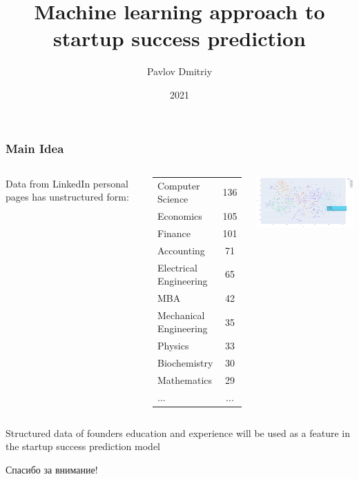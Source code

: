 \documentclass[8pt]{beamer}
\title{\huge{Machine learning approach to startup success prediction}}
\author{Pavlov Dmitriy}
\institute{Moscow Institute of Physics and Technology}
\date{2021}
\begin{document}
\frame{\titlepage}


\begin{frame}
    \frametitle{Main Idea}
    
    
    
    \begin{columns}
        
        Data from LinkedIn personal pages has unstructured form:
        
        \begin{center}
            \begin{tabular}{ l c }
            Computer Science                                  & 136 \\
            Economics                                         & 105 \\ 
            Finance                                           & 101 \\
            Accounting                                        &  71 \\ 
            Electrical Engineering                            &  65 \\ 
            MBA   &  42 \\ 
            Mechanical Engineering                            &  35 \\ 
            Physics                                           &  33 \\ 
            Biochemistry                                      &  30 \\ 
            Mathematics                                       &  29 \\
            ...                                               & ... \\
            \end{tabular}
        \end{center}
    
    
       \includegraphics[width=7cm]{figures/paper/kMeans-16-03.png}
        
    \end{columns}
    
    Structured data of founders education and experience will be used as a feature in the startup success prediction model 
    
\end{frame}


\begin{frame}
    \begin{center}
        \Huge{Спасибо за внимание!}
    \end{center}
\end{frame}
\end{document}
